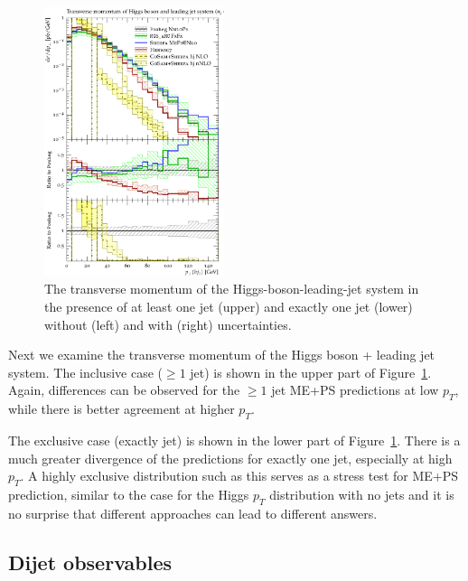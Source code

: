 \begin{figure}[t!]
  \hfill
  \includegraphics[width=0.47\textwidth]{figures/hjetscomp_Hj_pT_excl.pdf}
  \caption{
    The transverse momentum of the Higgs-boson-leading-jet system in the 
    presence of at least one jet (upper) and exactly one jet (lower)
    without (left) and with (right) uncertainties.
    \label{fig:higgscomp:results:1obs:hj_pt}
  }
\end{figure}

Next we examine the transverse momentum of the Higgs boson + leading
jet system. The inclusive case ($\ge 1$ jet) is shown in the upper
part of Figure~\ref{fig:higgscomp:results:1obs:hj_pt}.  Again,
differences can be observed for the $\ge 1$ jet ME+PS predictions at
low $p_T$, while there is better agreement at higher $p_T$.


The exclusive case (exactly jet) is shown in the lower part of
Figure~\ref{fig:higgscomp:results:1obs:hj_pt}.  There is a much
greater divergence of the predictions for exactly one jet, especially
at high $p_T$.  A highly exclusive distribution such as this serves as
a stress test for ME+PS prediction, similar to the case for the Higgs
$p_T$ distribution with no jets and it is no surprise that different
approaches can lead to different answers.



\clearpage
\subsection{Dijet observables}
\label{sec:hjetscomp:results:2jobs}

